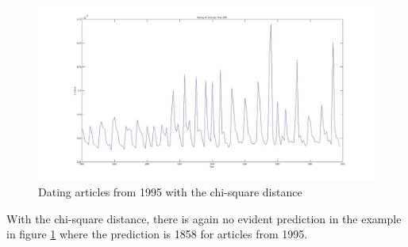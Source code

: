 \begin{figure}[H]
	\centering
        \includegraphics[scale=0.15]{Pictures/date_articles/chi2/dating1995_corrected.jpg}
        \caption{Dating articles from 1995 with the chi-square distance}
        \label{date_chi2}
\end{figure}
With the chi-square distance, there is again no evident prediction in the example in figure \ref{date_chi2} where the prediction is 1858 for articles from 1995.